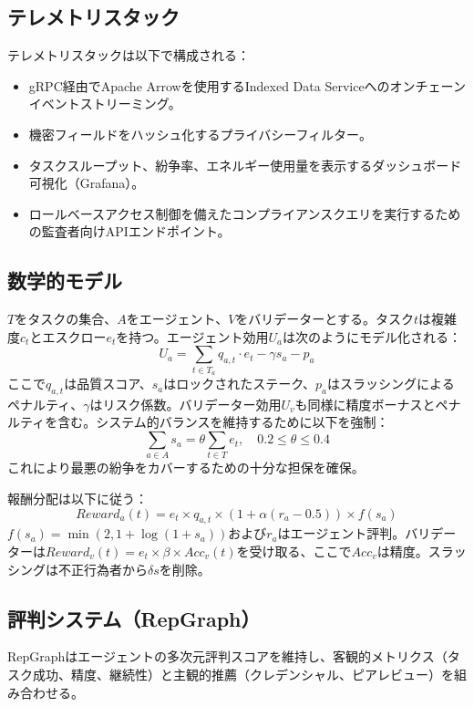 \documentclass[11pt]{article}
\begin{document}
\subsection{テレメトリスタック}
テレメトリスタックは以下で構成される：
\begin{itemize}[noitemsep]
  \item gRPC経由でApache Arrowを使用するIndexed Data Serviceへのオンチェーンイベントストリーミング。
  \item 機密フィールドをハッシュ化するプライバシーフィルター。
  \item タスクスループット、紛争率、エネルギー使用量を表示するダッシュボード可視化（Grafana）。
  \item ロールベースアクセス制御を備えたコンプライアンスクエリを実行するための監査者向けAPIエンドポイント。
\end{itemize}

\subsection{数学的モデル}
$T$をタスクの集合、$A$をエージェント、$V$をバリデーターとする。タスク$t$は複雑度$c_t$とエスクロー$e_t$を持つ。エージェント効用$U_a$は次のようにモデル化される：
\begin{equation}
U_a = \sum_{t \in T_a} q_{a,t}\cdot e_t - \gamma s_a - p_a\label{eq:agent-utility}
\end{equation}
ここで$q_{a,t}$は品質スコア、$s_a$はロックされたステーク、$p_a$はスラッシングによるペナルティ、$\gamma$はリスク係数。バリデーター効用$U_v$も同様に精度ボーナスとペナルティを含む。システム的バランスを維持するために以下を強制：
\begin{equation}
\sum_{a \in A} s_a = \theta \sum_{t \in T} e_t,\quad 0.2 \leq \theta \leq 0.4
\end{equation}
これにより最悪の紛争をカバーするための十分な担保を確保。

報酬分配は以下に従う：
\begin{equation}
Reward_a(t) = e_t \times q_{a,t} \times \left(1 + \alpha (r_a - 0.5)\right) \times f(s_a)
\end{equation}
$f(s_a) = \min(2, 1 + \log(1+s_a))$および$r_a$はエージェント評判。バリデーターは$Reward_v(t) = e_t \times \beta \times Acc_v(t)$を受け取る、ここで$Acc_v$は精度。スラッシングは不正行為者から$\delta s$を削除。

\subsection{評判システム（RepGraph）}
\label{sec:reputation}
RepGraphはエージェントの多次元評判スコアを維持し、客観的メトリクス（タスク成功、精度、継続性）と主観的推薦（クレデンシャル、ピアレビュー）を組み合わせる。
\end{document}
